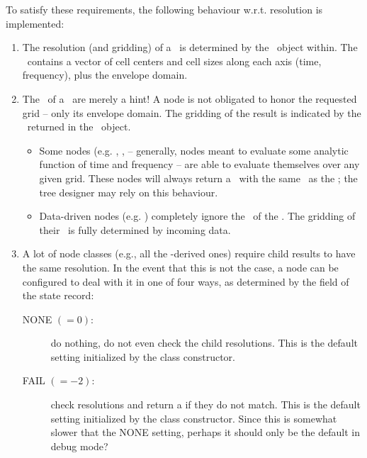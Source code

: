   To satisfy these requirements, the following behaviour w.r.t. resolution
  is implemented:
  
  \begin{enumerate}
  
  \item The resolution (and gridding) of a \Request\ is determined by the
  \Cells\ object within. The \Cells\ contains a vector of cell centers and cell
  sizes along each axis (time, frequency), plus the envelope domain. 

  \item The \Cells\ of a \Request\ are merely a hint! A node is not obligated
  to honor the requested grid -- only its envelope domain. The gridding of the
  result is indicated by the \Cells\ returned in the \Result\ object.

    \begin{itemize} 

    \item Some nodes (e.g. , ,  -- generally, nodes
    meant to evaluate some analytic function of time and frequency -- are able
    to evaluate themselves over any given grid. These nodes will always return
    a \Result\ with the same \Cells\ as the \Request; the tree designer may
    rely on this behaviour.

    \item Data-driven nodes (e.g. ) completely ignore the \Cells\
    of the \Request. The gridding of their \Result\ is fully determined by
    incoming data.

    \end{itemize}
    
  \item A lot of node classes (e.g., all the -derived ones)
  require child results to have the same resolution. In the event that this is
  not the case, a node can be configured to deal with it in one of four ways,
  as determined by the \qq{auto\_resample} field of the state record:

    \begin{description}
    
    \item[NONE $(=0)$:] do nothing, do not even check the child resolutions. This
    is the default setting initialized by the \qq{Node} class constructor.

    \item[FAIL $(=-2)$:] check resolutions and return a  if they do
    not match. This is the default setting  initialized by the \qq{Function}
    class constructor. Since this is somewhat slower that the NONE setting, 
    perhaps it should only be the default in debug mode?
    

\end{description}
\end{enumerate}
